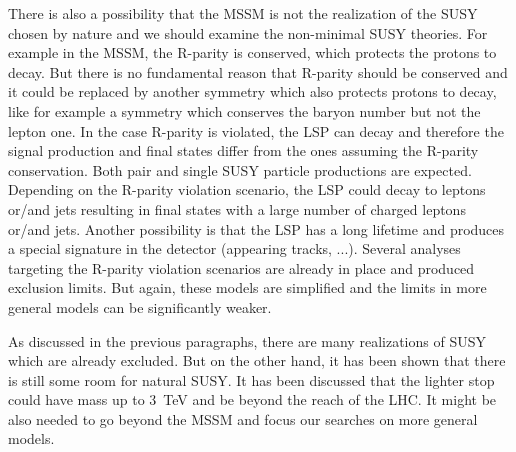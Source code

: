 There is also a possibility that the MSSM is not the realization of the SUSY chosen by nature and we should examine the non-minimal SUSY theories. For example in the MSSM, the R-parity is conserved, which protects the protons to decay. But there is no fundamental reason that R-parity should be conserved and it could be replaced by another symmetry which also protects protons to decay, like for example a symmetry which conserves the baryon number but not the lepton one. In the case R-parity is violated, the LSP can decay and therefore the signal production and final states differ from the ones assuming the R-parity conservation. Both pair and single SUSY particle productions are expected. Depending on the R-parity violation scenario, the LSP could decay to leptons or/and jets resulting in final states with a large number of charged leptons or/and jets. Another possibility is that the LSP has a long lifetime and produces a special signature in the detector (appearing tracks, ...). Several analyses targeting the R-parity violation scenarios are already in place and produced exclusion limits. But again, these models are simplified and the limits in more general models can be significantly weaker.

As discussed in the previous paragraphs, there are many realizations of SUSY which are already excluded. But on the other hand, it has been shown that there is still some room for natural SUSY. It has been discussed that the lighter stop could have mass up to 3~TeV and be beyond the reach of the LHC. It might be also needed to go beyond the MSSM and focus our searches on more general models.

